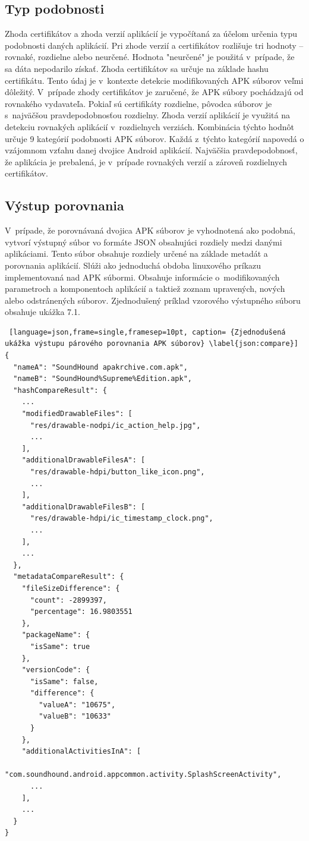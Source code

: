 \subsection*{Typ podobnosti}
Zhoda certifikátov a zhoda verzií aplikácií je vypočítaná za účelom určenia typu podobnosti daných aplikácií. Pri zhode verzií a certifikátov rozlišuje tri hodnoty – rovnaké, rozdielne alebo neurčené. Hodnota "neurčené" je použitá v~prípade, že sa dáta nepodarilo získať. Zhoda certifikátov sa určuje na základe hashu certifikátu. Tento údaj je v~kontexte detekcie modifikovaných APK súborov veľmi dôležitý. V~prípade zhody certifikátov je zaručené, že APK súbory pochádzajú od rovnakého vydavateľa. Pokiaľ sú certifikáty rozdielne, pôvodca súborov je s~najväčšou pravdepodobnosťou rozdielny. Zhoda verzií aplikácií je využitá na detekciu rovnakých aplikácií v~rozdielnych verziách.
Kombinácia týchto hodnôt určuje 9 kategórií podobnosti APK súborov. Každá z~týchto kategórií napovedá o vzájomnom vzťahu danej dvojice Android aplikácií. Najväčšia pravdepodobnosť, že aplikácia je prebalená, je v~prípade rovnakých verzií a zároveň rozdielnych certifikátov. 

\subsection*{Výstup porovnania}
V~prípade, že porovnávaná dvojica APK súborov je vyhodnotená ako podobná,  vytvorí výstupný súbor vo formáte JSON obsahujúci rozdiely medzi danými aplikáciami. Tento súbor obsahuje rozdiely určené na základe metadát a porovnania aplikácií. Slúži ako jednoduchá obdoba linuxového príkazu  implementovaná nad APK súbormi. Obsahuje informácie o~modifikovaných parametroch a komponentoch aplikácií a taktiež zoznam upravených, nových alebo odstránených súborov. Zjednodušený príklad vzorového výstupného súboru obsahuje ukážka 7.1.
\begin{lstlisting} [language=json,frame=single,framesep=10pt, caption= {Zjednodušená ukážka výstupu párového porovnania APK súborov} \label{json:compare}]
{
  "nameA": "SoundHound apakrchive.com.apk",
  "nameB": "SoundHound%Supreme%Edition.apk",
  "hashCompareResult": {
    ...
    "modifiedDrawableFiles": [
      "res/drawable-nodpi/ic_action_help.jpg",
      ...
    ],
    "additionalDrawableFilesA": [
      "res/drawable-hdpi/button_like_icon.png",
      ...
    ],
    "additionalDrawableFilesB": [
      "res/drawable-hdpi/ic_timestamp_clock.png",
      ...
    ],
    ...
  },
  "metadataCompareResult": {
    "fileSizeDifference": {
      "count": -2899397,
      "percentage": 16.9803551
    },
    "packageName": {
      "isSame": true
    },
    "versionCode": {
      "isSame": false,
      "difference": {
        "valueA": "10675",
        "valueB": "10633"
      }
    },
    "additionalActivitiesInA": [
      "com.soundhound.android.appcommon.activity.SplashScreenActivity",
      ...
    ],
    ...
  }
}
\end{lstlisting}

